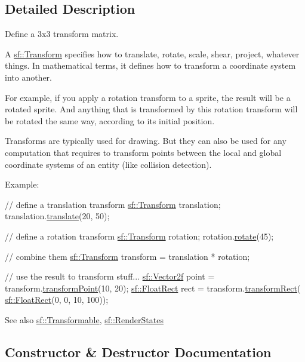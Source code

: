 \subsection{Detailed Description}
Define a 3x3 transform matrix. 

A \hyperlink{classsf_1_1_transform}{sf\+::\+Transform} specifies how to translate, rotate, scale, shear, project, whatever things. In mathematical terms, it defines how to transform a coordinate system into another.

For example, if you apply a rotation transform to a sprite, the result will be a rotated sprite. And anything that is transformed by this rotation transform will be rotated the same way, according to its initial position.

Transforms are typically used for drawing. But they can also be used for any computation that requires to transform points between the local and global coordinate systems of an entity (like collision detection).

Example\+: 
\begin{DoxyCode}
\textcolor{comment}{// define a translation transform}
\hyperlink{classsf_1_1_transform}{sf::Transform} translation;
translation.\hyperlink{classsf_1_1_transform_ab54f6c8070cc05e2afcb3145fbf4395a}{translate}(20, 50);

\textcolor{comment}{// define a rotation transform}
\hyperlink{classsf_1_1_transform}{sf::Transform} rotation;
rotation.\hyperlink{classsf_1_1_transform_a3e548c3c9e3fb9d4bd43cf852669e555}{rotate}(45);

\textcolor{comment}{// combine them}
\hyperlink{classsf_1_1_transform}{sf::Transform} transform = translation * rotation;

\textcolor{comment}{// use the result to transform stuff...}
\hyperlink{classsf_1_1_vector2}{sf::Vector2f} point = transform.\hyperlink{classsf_1_1_transform_af2e38c3c077d28898686662558b41135}{transformPoint}(10, 20);
\hyperlink{classsf_1_1_rect}{sf::FloatRect} rect = transform.\hyperlink{classsf_1_1_transform_a3824a20505d81a94bc22be1ffee57d3d}{transformRect}(
      \hyperlink{classsf_1_1_rect}{sf::FloatRect}(0, 0, 10, 100));
\end{DoxyCode}


\begin{DoxySeeAlso}{See also}
\hyperlink{classsf_1_1_transformable}{sf\+::\+Transformable}, \hyperlink{classsf_1_1_render_states}{sf\+::\+Render\+States} 
\end{DoxySeeAlso}


\subsection{Constructor \& Destructor Documentation}
\mbox{\label{classsf_1_1_transform_ac32de51bd0b9f3d52fbe0838225ee83b}} 
